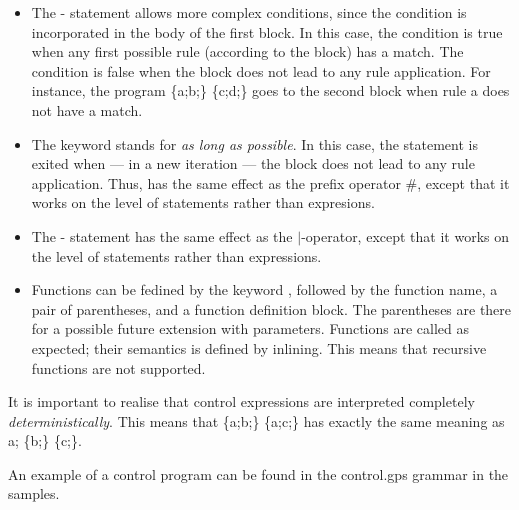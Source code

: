\begin{itemize}
\item The \tryK-\elseK{} statement allows more complex conditions, since the
  condition is incorporated in the body of the first block. In this case, the
  condition is true when any first possible rule (according to the block) has a
  match. The condition is false when the block does not lead to any rule
  application.  For instance, the program \textsf{\tryK{} \{a;b;\}
  \elseK{} \{c;d;\}} goes to the second block when rule \textsf{a}
  does not have a match.

\item The \alapK{} keyword stands for \emph{as long as possible}. In this case,
  the statement is exited when --- in a new iteration --- the block does not
  lead to any rule application. Thus, \alapK{} has the same effect as the
  prefix operator \textsf{\#}, except that it works on the level of statements
  rather than expresions.

\item The \choiceK-\doK{} statement has the same effect as the
  \textsf{$|$}-operator, except that it works on the level of statements rather
  than expressions.

\item Functions can be fedined by the keyword \functionK, followed by the
  function name, a pair of parentheses, and a function definition block. The
  parentheses are there for a possible future extension with
  parameters. Functions are called as expected; their semantics is defined by
  inlining. This means that recursive functions are not supported.
\end{itemize}
%
It is important to realise that control expressions are interpreted completely
\emph{deterministically}. This means that \textsf{\choiceK{} \{a;b;\} \orK{}
\{a;c;\}} has exactly the same meaning as \textsf{a; \choiceK{} \{b;\} \orK{}
\{c;\}}.

An example of a control program can be found in the \textsf{control.gps}
grammar in the \Groove{} samples.
